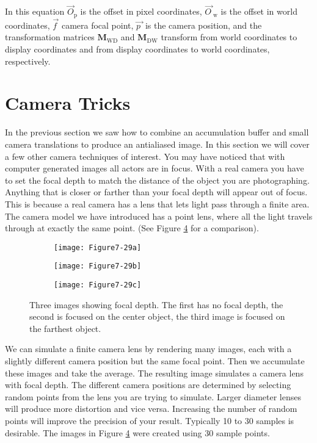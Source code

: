In this equation $\overrightarrow{O}_\text{p}$ is the offset in pixel coordinates, $\overrightarrow{O\ }_\text{w}$ is the offset in world coordinates, $\overrightarrow{f\ }$ camera focal point, $\overrightarrow{p\ }$ is the camera position, and the transformation matrices $\textbf{M}_\text{WD}$ and  $\textbf{M}_\text{DW}$ transform from world coordinates to display coordinates and from display coordinates to world coordinates, respectively.

\section{Camera Tricks}

In the previous section we saw how to combine an accumulation buffer and small camera translations to produce an antialiased image. In this section we will cover a few other camera techniques of interest. You may have noticed that with computer generated images all actors are in focus. With a real camera you have to set the focal depth to match the distance of the object you are photographing. Anything that is closer or farther than your focal depth will appear out of focus. This is because a real camera has a lens that lets light pass through a finite area. The camera model we have introduced has a point lens, where all the light travels through at exactly the same point. (See Figure \ref{fig:Figure7-29} for a comparison).

\begin{figure}[!htb]
	\centering
	\begin{subfigure}{0.32\linewidth}
		\centering
		\texttt{[image: Figure7-29a]}
		\caption*{}\label{fig:Figure7-29a}
	\end{subfigure}
	\hfill
	\begin{subfigure}{0.32\linewidth}
		\centering
		\texttt{[image: Figure7-29b]}
		\caption*{}\label{fig:Figure7-29b}
	\end{subfigure}%
	\hfill
	\begin{subfigure}{0.32\linewidth}
		\centering
		\texttt{[image: Figure7-29c]}
		\caption*{}\label{fig:Figure7-29c}
	\end{subfigure}%
	\caption{Three images showing focal depth. The first has no focal depth, the second is focused on the center object, the third image is focused on the farthest object.}
	\label{fig:Figure7-29}
\end{figure}

We can simulate a finite camera lens by rendering many images, each with a slightly different camera position but the same focal point. Then we accumulate these images and take the average. The resulting image simulates a camera lens with focal depth. The different camera positions are determined by selecting random points from the lens you are trying to simulate. Larger diameter lenses will produce more distortion and vice versa. Increasing the number of random points will improve the precision of your result. Typically 10 to 30 samples is desirable. The images in Figure \ref{fig:Figure7-29} were created using 30 sample points.

